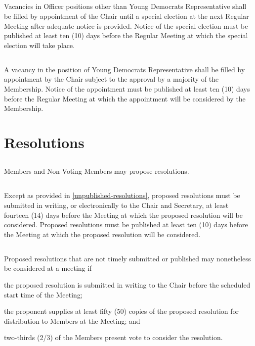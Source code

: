 \subsection{}
Vacancies in Officer positions other than Young Democrats Representative shall be filled by appointment of the Chair until a special election at the next Regular Meeting after adequate notice is provided. Notice of the special election must be published at least ten (10) days before the Regular Meeting at which the special election will take place.

\subsection{}
A vacancy in the position of Young Democrats Representative shall be filled by appointment by the Chair subject to the approval by a majority of the Membership. Notice of the appointment must be published at least ten (10) days before the Regular Meeting at which the appointment will be considered by the Membership.

\section{Resolutions}
\subsection{}
Members and Non-Voting Members may propose resolutions.

\subsection{}
Except as provided in \autoref{unpublished-resolutions}, proposed resolutions must be submitted in writing, or electronically to the Chair and Secretary, at least fourteen (14) days before the Meeting at which the proposed resolution will be considered. Proposed resolutions must be published at least ten (10) days before the Meeting at which the proposed resolution will be considered.

\subsection{} \label{unpublished-resolutions}
Proposed resolutions that are not timely submitted or published may nonetheless be considered at a meeting if
\begin{inlinealphalist}
    \item the proposed resolution is submitted in writing to the Chair before the scheduled start time of the Meeting;
    \item the proponent supplies at least fifty (50) copies of the proposed resolution for distribution to Members at the Meeting; and
    \item two-thirds (2/3) of the Members present vote to consider the resolution.
\end{inlinealphalist}

